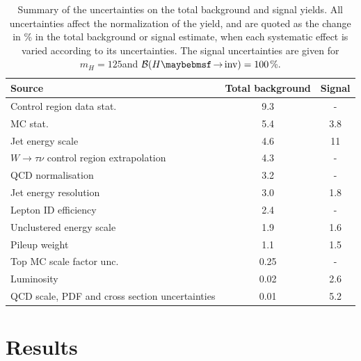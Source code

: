 \begin{table}[!htb]
\centering
\begin{tabular}{|l|c|c|}
\hline 
Source                                            & Total background &     Signal \\
\hline\hline
Control region data stat.                          &            9.3  &          - \\
MC stat.                                           &            5.4  &        3.8 \\
Jet energy scale                                   &            4.6  &         11 \\
$W\rightarrow\tau\nu$ control region extrapolation &            4.3  &          - \\
QCD normalisation                                  &            3.2  &          - \\
Jet energy resolution                              &            3.0  &        1.8 \\
Lepton ID efficiency                               &            2.4  &          - \\
Unclustered energy scale                           &            1.9  &        1.6 \\
Pileup weight                                      &            1.1  &        1.5 \\
Top MC scale factor unc.                           &            0.25 &          - \\
Luminosity                                         &            0.02 &        2.6 \\
QCD scale, PDF and cross section uncertainties     &            0.01 &        5.2 \\
\hline
\end{tabular}
\caption{Summary of the uncertainties on the total background and signal yields. All uncertainties affect the normalization of the yield, and are quoted as the change in \% in the total background or signal estimate, when each systematic effect is varied according to its uncertainties. The signal uncertainties are given for $m_H=125$\GeV and $\BRinv=100$\%. \cite{ARTICLE:CMSVBFHiggsInvisibleParkedAnalysisPAS}}
\label{TABLE:ParkedDataAnalysis_Systematics_Summary}
\end{table}

\section{Results}

